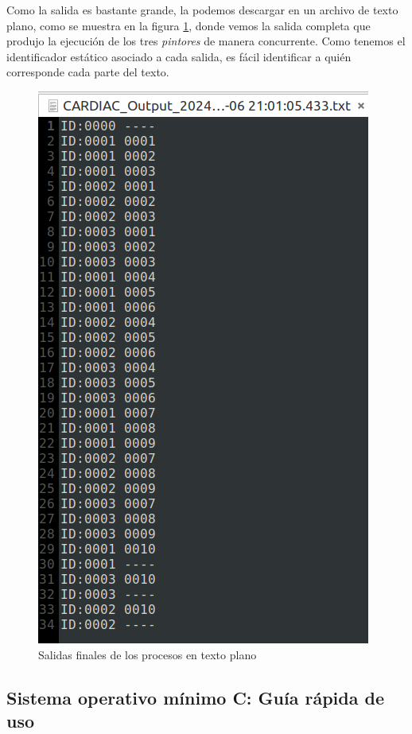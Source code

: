 \documentclass[letterpaper,12pt,oneside]{book}
\begin{document}
		Como la salida es bastante grande, la podemos descargar en un archivo de texto plano, como se muestra en la figura \ref{fig:Salida3Procesos}, 
		donde
		vemos la salida completa que produjo la ejecución de los tres \textit{pintores} de manera concurrente. Como tenemos el identificador estático 
		asociado a cada salida, es fácil identificar a quién corresponde cada parte del texto.
		
		
		\begin{figure}[h]		
			\centering
			\includegraphics[scale=0.42]{media/CARDIACC/Salida3Procesos.png}
			\caption{Salidas finales de los procesos en texto plano}
			\label{fig:Salida3Procesos}
		\end{figure}

		\clearpage
		
		\subsection{Sistema operativo mínimo C: Guía rápida de uso}
		
\end{document}
